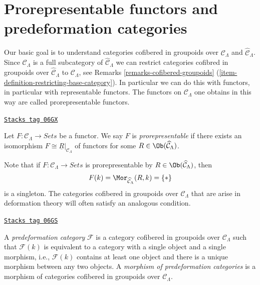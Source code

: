 \section{Prorepresentable functors and predeformation categories}
\label{formal-defos-section-cofibered-groupoids}
Our basic goal is to understand categories cofibered in groupoids over
$\mathcal{C}_\Lambda$ and $\widehat{\mathcal{C}}_\Lambda$. Since
$\mathcal{C}_\Lambda$ is a full subcategory of
$\widehat{\mathcal{C}}_\Lambda$ we can restrict categories cofibred in
groupoids over $\widehat{\mathcal{C}}_\Lambda$ to $\mathcal{C}_\Lambda$, see
Remarks \ref{remarks-cofibered-groupoids}
(\ref{item-definition-restricting-base-category}).
In particular we can do this with functors, in particular with
representable functors. The functors on $\mathcal{C}_\Lambda$
one obtains in this way are called
prorepresentable functors.

\begin{definition}[Prorepresentable]
\label{formal-defos-definition-prorepresentable}
\href{https://stacks.math.columbia.edu/tag/06GX}{\texttt{Stacks tag 06GX}}

Let $F : \mathcal{C}_\Lambda \to \textit{Sets}$ be a functor.
We say $F$ is {\it prorepresentable} if there exists an isomorphism
$F \cong \underline{R}|_{\mathcal{C}_\Lambda}$ of functors for some
$R \in \Ob(\widehat{\mathcal{C}}_\Lambda)$.
\end{definition}

Note that if $F : \mathcal{C}_\Lambda \to \textit{Sets}$ is prorepresentable
by $R \in \Ob(\widehat{\mathcal{C}}_\Lambda)$, then
$$
F(k) = \Mor_{\widehat{\mathcal{C}}_\Lambda}(R, k) = \{*\}
$$
is a singleton. The categories cofibered in groupoids over
$\mathcal{C}_\Lambda$ that are arise in deformation theory will often satisfy
an analogous condition.

\begin{definition}
\label{formal-defos-definition-predeformation-category}
\href{https://stacks.math.columbia.edu/tag/06GS}{\texttt{Stacks tag 06GS}}

A {\it predeformation category} $\mathcal{F}$ is a category cofibered
in groupoids over $\mathcal{C}_\Lambda$ such that $\mathcal{F}(k)$ is
equivalent to a category with a single object and a single morphism,
i.e., $\mathcal{F}(k)$ contains at least one object and there is a
unique morphism between any two objects. A {\it morphism of predeformation
categories} is a morphism of categories cofibered in groupoids over
$\mathcal{C}_\Lambda$.
\end{definition}

